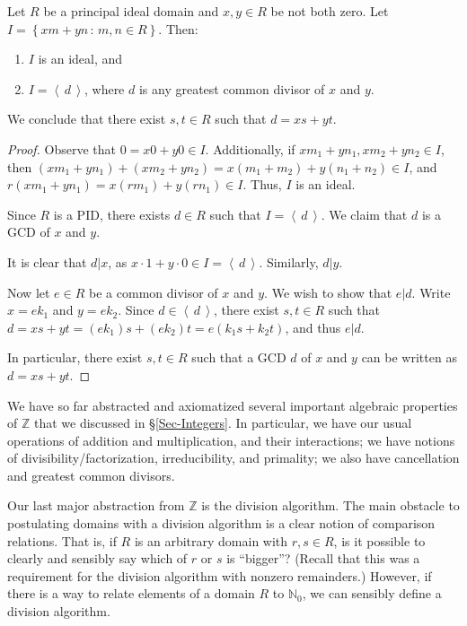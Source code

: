 \documentclass[english,course]{lecture}
\newcommand{\ideal}[1]{\left\langle\, #1 \,\right\rangle}
\theoremstyle{plain}
\def\setof#1#2{{\left\{#1\,\colon\,#2\right\}}}
\def\Z{{\mathbb Z}}
\def\N{{\mathbb N}}
\def\presnotes{}
\begin{document}
\presnotes


\begin{theorem}
    Let $R$ be a principal ideal domain and $x,y\in R$ be not both zero.
    Let $I = \setof{xm+yn}{m,n\in R}$.
    Then:
    \begin{enumerate}
        \item $I$ is an ideal, and
        \item $I = \ideal{d}$, where $d$ is any greatest common divisor of $x$ and $y$.
    \end{enumerate}
    We conclude that there exist $s,t\in R$ such that $d = xs + yt$.
\end{theorem}

\begin{proof}
    Observe that $0 = x0 + y0 \in I$.
    Additionally, if $x m_1 + y n_1, x m_2 + y n_2\in I$, then $(x m_1 + y n_1) + (x m_2 + y n_2) = x (m_1 + m_2) + y (n_1 + n_2) \in I$, and $r(x m_1 + y n_1) = x (rm_1) + y(rn_1) \in I$.
    Thus, $I$ is an ideal.

    Since $R$ is a PID, there exists $d\in R$ such that $I = \ideal{d}$.
    We claim that $d$ is a GCD of $x$ and $y$.
    
    It is clear that $d|x$, as $x\cdot 1 + y\cdot 0\in I = \ideal{d}$.
    Similarly, $d|y$.
    
    Now let $e\in R$ be a common divisor of $x$ and $y$.
    We wish to show that $e|d$.
    Write $x = e k_1$ and $y = e k_2$.
    Since $d\in \ideal{d}$, there exist $s,t\in R$ such that $d = x s + yt = (e k_1) s + (e k_2)t = e(k_1 s + k_2 t)$, and thus $e|d$.
    
    In particular, there exist $s,t\in R$ such that a GCD $d$ of $x$ and $y$ can be written as $d = xs + yt$.
\end{proof}

\presnotes

We have so far abstracted and axiomatized several important algebraic properties of $\Z$ that we discussed in  \S \ref{Sec-Integers}.
In particular, we have our usual operations of addition and multiplication, and their interactions; we have notions of divisibility/factorization, irreducibility, and primality; we also have cancellation and greatest common divisors.

Our last major abstraction from $\Z$ is the division algorithm.
The main obstacle to postulating domains with a division algorithm is a clear notion of comparison relations.
That is, if $R$ is an arbitrary domain with $r,s\in R$, is it possible to clearly and sensibly say which of $r$ or $s$ is ``bigger''? (Recall that this was a requirement for the division algorithm with nonzero remainders.)
However, if there is a way to relate elements of a domain $R$ to $\N_0$, we can sensibly define a division algorithm.
\end{document}
